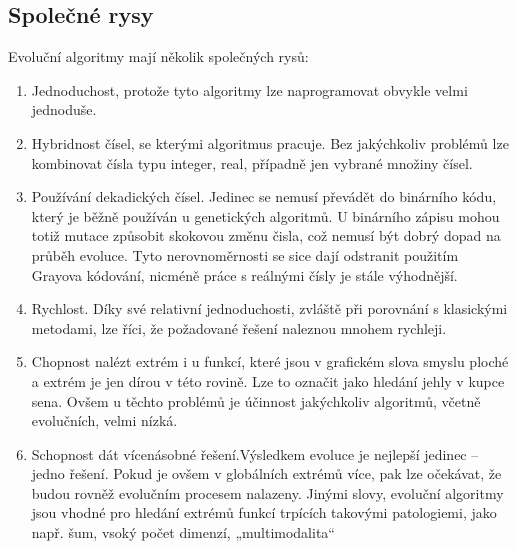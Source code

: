 \documentclass[bc,male,java,dept460]{diploma}		%
\begin{document}
\subsection{Společné rysy}
Evoluční algoritmy mají několik společných rysů:
\begin{enumerate}
\item Jednoduchost, protože tyto algoritmy lze naprogramovat obvykle velmi jednoduše.
\item Hybridnost čísel, se kterými algoritmus pracuje. Bez jakýchkoliv problémů lze kombinovat čísla typu integer, real, případně jen vybrané množiny čísel.
\item Používání dekadických čísel. Jedinec se nemusí převádět do binárního kódu, který je běžně používán u genetických algoritmů. U binárního zápisu mohou totiž mutace způsobit skokovou změnu čisla, což nemusí být dobrý dopad na průběh evoluce. Tyto nerovnoměrnosti se sice dají odstranit použitím Grayova kódování, nicméně práce s reálnými čísly je stále výhodnější.
\item Rychlost. Díky své relativní jednoduchosti, zvláště při porovnání s klasickými metodami, lze říci, že požadované řešení naleznou mnohem rychleji.
\item Chopnost nalézt extrém i u funkcí, které jsou v grafickém slova smyslu ploché a extrém je jen dírou v této rovině. Lze to označit jako hledání jehly v kupce sena. Ovšem u těchto problémů je účinnost jakýchkoliv algoritmů, včetně evolučních, velmi nízká.
\item Schopnost dát vícenásobné řešení.Výsledkem evoluce je nejlepší jedinec – jedno řešení. Pokud je ovšem v globálních extrémů více, pak lze očekávat, že budou rovněž evolučním procesem nalazeny.
Jinými slovy, evoluční algoritmy jsou vhodné pro hledání extrémů funkcí trpících takovými patologiemi, jako např. šum, vsoký počet dimenzí, „multimodalita“
\end{enumerate}
\end{document}
